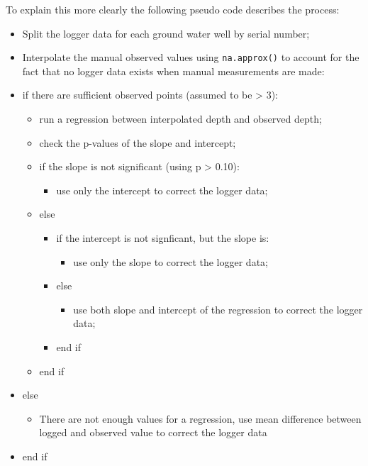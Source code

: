 \documentclass[, manuscript]{copernicus}
\providecommand{\tightlist}{%
  \setlength{\itemsep}{0pt}\setlength{\parskip}{0pt}}
\begin{document}
To explain this more clearly the following pseudo code describes the
process:

\begin{itemize}
\tightlist
\item
  Split the logger data for each ground water well by serial number;
\item
  Interpolate the manual observed values using \texttt{na.approx()} to
  account for the fact that no logger data exists when manual
  measurements are made:
\item
  if there are sufficient observed points (assumed to be \textgreater{}
  3):

  \begin{itemize}
  \tightlist
  \item
    run a regression between interpolated depth and observed depth;
  \item
    check the p-values of the slope and intercept;
  \item
    if the slope is not significant (using p \textgreater{} 0.10):

    \begin{itemize}
    \tightlist
    \item
      use only the intercept to correct the logger data;
    \end{itemize}
  \item
    else

    \begin{itemize}
    \tightlist
    \item
      if the intercept is not signficant, but the slope is:

      \begin{itemize}
      \tightlist
      \item
        use only the slope to correct the logger data;
      \end{itemize}
    \item
      else

      \begin{itemize}
      \tightlist
      \item
        use both slope and intercept of the regression to correct the
        logger data;
      \end{itemize}
    \item
      end if
    \end{itemize}
  \item
    end if
  \end{itemize}
\item
  else

  \begin{itemize}
  \tightlist
  \item
    There are not enough values for a regression, use mean difference
    between logged and observed value to correct the logger data
  \end{itemize}
\item
  end if
\end{itemize}
\end{document}
